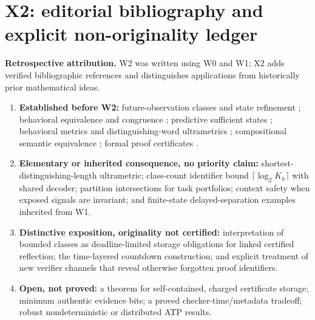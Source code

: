 \documentclass[11pt,letterpaper]{article}
\begin{document}
\section{X2: editorial bibliography and explicit non-originality ledger}
\label{app:attributionX2}
\noindent\textbf{Retrospective attribution.} W2 was written using W0 and W1; X2 adds verified bibliographic references and distinguishes applications from historically prior mathematical ideas.
\begin{enumerate}[leftmargin=*,itemsep=.25em]
\item \textbf{Established before W2:} future-observation classes and state refinement \cite{nerode}; behavioral equivalence and congruence \cite{milner}; predictive sufficient states \cite{shalizi}; behavioral metrics and distinguishing-word ultrametrics \cite{bonchi,ilchev}; compositional semantic equivalence \cite{scott,milner}; formal proof certificates \cite{necula,besson}.
\item \textbf{Elementary or inherited consequence, no priority claim:} shortest-distinguishing-length ultrametric; class-count identifier bound $\lceil\log_2 K_h\rceil$ with shared decoder; partition intersections for task portfolios; context safety when exposed signals are invariant; and finite-state delayed-separation examples inherited from W1.
\item \textbf{Distinctive exposition, originality not certified:} interpretation of bounded classes as deadline-limited storage obligations for linked certified reflection; the time-layered countdown construction; and explicit treatment of new verifier channels that reveal otherwise forgotten proof identifiers.
\item \textbf{Open, not proved:} a theorem for self-contained, charged certificate storage; minimum authentic evidence bits; a proved checker-time/metadata tradeoff; robust nondeterministic or distributed ATP results.
\end{enumerate}
\end{document}
